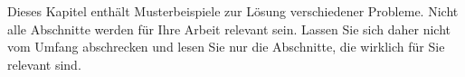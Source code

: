 Dieses Kapitel enthält Musterbeispiele zur Lösung verschiedener Probleme. Nicht
alle Abschnitte werden für Ihre Arbeit relevant sein. Lassen Sie sich daher
nicht vom Umfang abschrecken und lesen Sie nur die Abschnitte, die wirklich für
Sie relevant sind.
